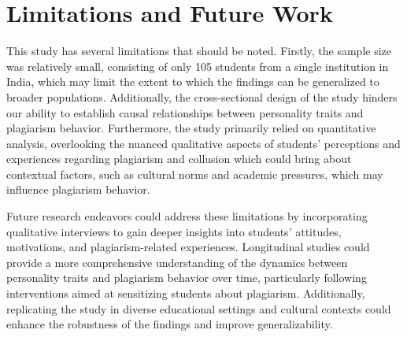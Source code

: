\section{Limitations and Future Work}
\label{sec:limitations}
This study has several limitations that should be noted. Firstly, the sample size was relatively small, consisting of only 105 students from a single institution in India, which may limit the extent to which the findings can be generalized to broader populations. Additionally, the cross-sectional design of the study hinders our ability to establish causal relationships between personality traits and plagiarism behavior. Furthermore, the study primarily relied on quantitative analysis, overlooking the nuanced qualitative aspects of students' perceptions and experiences regarding plagiarism and collusion which could bring about contextual factors, such as cultural norms and academic pressures, which may influence plagiarism behavior.

Future research endeavors could address these limitations by incorporating qualitative interviews to gain deeper insights into students' attitudes, motivations, and plagiarism-related experiences. Longitudinal studies could provide a more comprehensive understanding of the dynamics between personality traits and plagiarism behavior over time, particularly following interventions aimed at sensitizing students about plagiarism. Additionally, replicating the study in diverse educational settings and cultural contexts could enhance the robustness of the findings and improve generalizability.
 